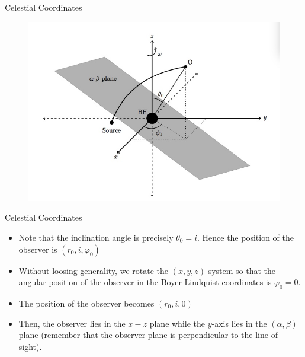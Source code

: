 \documentclass{beamer}
\begin{document}
\begin{frame}{Celestial Coordinates}
	\begin{center}
      \begin{figure}
      	\includegraphics[scale=0.35] {figures/celestialcoordinates1.jpeg}
      \end{figure}
	\end{center}	
\end{frame}

\begin{darkframes}

\begin{frame}{Celestial Coordinates}
	\begin{itemize}
	\item Note that the inclination angle is precisely $\theta_0 = i$. Hence the position of the observer is $(r_0, i, \varphi_0)$
	\pause
	\item Without loosing generality, we rotate the $(x,y,z)$ system so that the angular position of the observer in the Boyer-Lindquist coordinates is $\varphi_0 = 0$. 
	\pause
	\item The position of the observer becomes $(r_0, i, 0)$
	\pause
	\item Then, the observer lies in the $x-z$ plane while the $y$-axis lies in the $(\alpha, \beta)$ plane (remember that the observer plane is perpendicular to the line of sight).  	 
    	\end{itemize}
\end{frame}

\end{darkframes}
\end{document}

